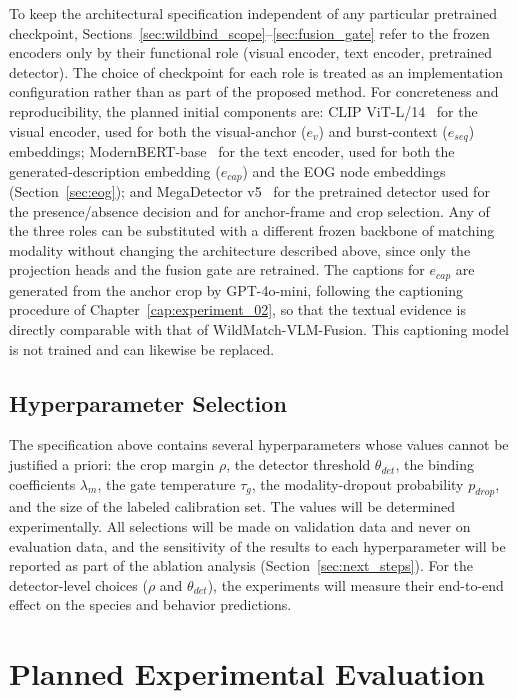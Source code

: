 To keep the architectural specification independent of any particular pretrained checkpoint, Sections~\ref{sec:wildbind_scope}--\ref{sec:fusion_gate} refer to the frozen encoders only by their functional role (visual encoder, text encoder, pretrained detector). The choice of checkpoint for each role is treated as an implementation configuration rather than as part of the proposed method. For concreteness and reproducibility, the planned initial components are: CLIP ViT-L/14~\citep{radford2021learning} for the visual encoder, used for both the visual-anchor ($e_v$) and burst-context ($e_{seq}$) embeddings; ModernBERT-base~\citep{warner2024modernbert} for the text encoder, used for both the generated-description embedding ($e_{cap}$) and the EOG node embeddings (Section~\ref{sec:eog}); and MegaDetector v5~\citep{beery2019efficient} for the pretrained detector used for the presence/absence decision and for anchor-frame and crop selection. Any of the three roles can be substituted with a different frozen backbone of matching modality without changing the architecture described above, since only the projection heads and the fusion gate are retrained. The captions for $e_{cap}$ are generated from the anchor crop by GPT-4o-mini, following the captioning procedure of Chapter~\ref{cap:experiment_02}, so that the textual evidence is directly comparable with that of WildMatch-VLM-Fusion. This captioning model is not trained and can likewise be replaced.

\subsection{Hyperparameter Selection}\label{sec:hyperparameters}

The specification above contains several hyperparameters whose values cannot be justified a priori: the crop margin $\rho$, the detector threshold $\theta_{det}$, the binding coefficients $\lambda_m$, the gate temperature $\tau_g$, the modality-dropout probability $p_{drop}$, and the size of the labeled calibration set. The values will be determined experimentally. All selections will be made on validation data and never on evaluation data, and the sensitivity of the results to each hyperparameter will be reported as part of the ablation analysis (Section~\ref{sec:next_steps}). For the detector-level choices ($\rho$ and $\theta_{det}$), the experiments will measure their end-to-end effect on the species and behavior predictions.

\section{Planned Experimental Evaluation}

